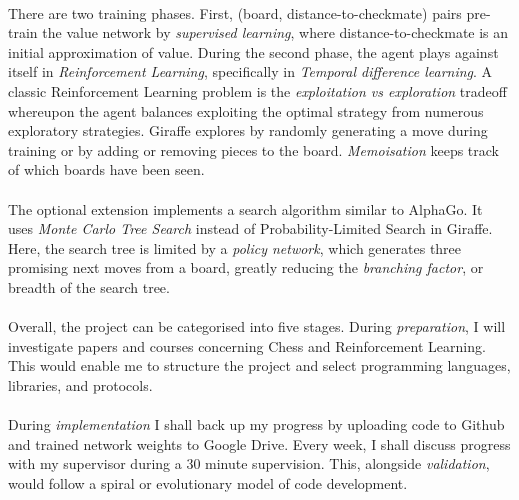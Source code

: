 \documentclass[a4paper]{article}
\begin{document}
\paragraph{} There are two training phases. First, (board, distance-to-checkmate) pairs pre-train the value network by \textit{supervised learning}, where distance-to-checkmate is an initial approximation of value. During the second phase, the agent plays against itself in \textit{Reinforcement Learning}, specifically in \textit{Temporal difference learning}. A classic Reinforcement Learning problem is the \textit{exploitation vs exploration} tradeoff whereupon the agent balances exploiting the optimal strategy from numerous exploratory strategies. Giraffe explores by randomly generating a move during training or by adding or removing pieces to the board. \textit{Memoisation} keeps track of which boards have been seen. \cite{giraffe}

\paragraph{}The optional extension implements a search algorithm similar to AlphaGo. It uses \textit{Monte Carlo Tree Search} instead of Probability-Limited Search in Giraffe. Here, the search tree is limited by a \textit{policy network}, which generates three promising next moves from a board, greatly reducing the \textit{branching factor}, or breadth of the search tree. \cite{AlphaGo}

\paragraph{}Overall, the project can be categorised into five stages. During \textit{preparation}, I will investigate papers and courses concerning Chess and Reinforcement Learning. \cite{giraffe} \cite{AlphaGo} \cite{TD-Gammon} \cite{knightcap} This would enable me to structure the project and select programming languages, libraries, and protocols.

\paragraph{}During \textit{implementation} I shall back up my progress by uploading code to Github and trained network weights to Google Drive. Every week, I shall discuss progress with my supervisor during a 30 minute supervision. This, alongside \textit{validation}, would follow a spiral or evolutionary model of code development.
\end{document}
